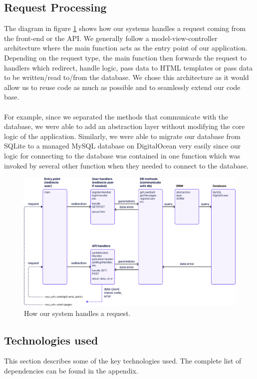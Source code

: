 \documentclass{article}
\begin{document}
\subsection{Request Processing}
The diagram in figure \ref{fig:request_pipeline} shows how our systems handles a request coming from the front-end or the API. We generally follow a model-view-controller architecture where the main function acts as the entry point of our application. Depending on the request type, the main function then forwards the request to handlers which redirect, handle logic, pass data to HTML templates or pass data to be written/read to/from the database. We chose this architecture as it would allow us to reuse code as much as possible and to seamlessly extend our code base. 
\\\\
For example, since we separated the methods that communicate with the database, we were able to add an abstraction layer without modifying the core logic of the application. Similarly, we were able to migrate our database from SQLite to a managed MySQL database on DigitalOcean very easily since our logic for connecting to the database was contained in one function which was invoked by several other function when they needed to connect to the database.

\begin{figure}[ht]
    \centering
    \includegraphics[width=1.0\textwidth]{./images/request_pipeline_v2.png}
    \caption{How our system handles a request.}
    \label{fig:request_pipeline}
\end{figure}

\subsection{Technologies used}
This section describes some of the key technologies used. The complete list of dependencies can be found in the appendix.
\end{document}

